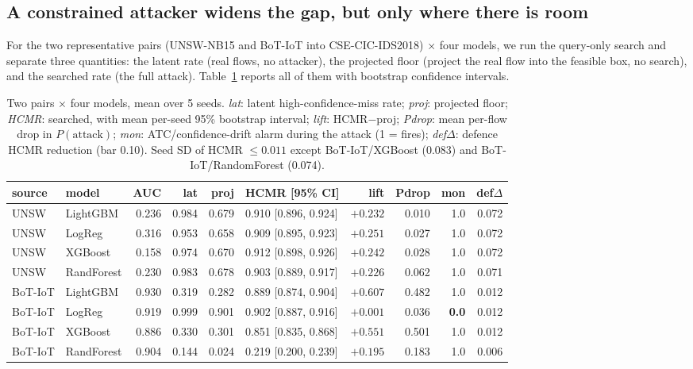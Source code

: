 \documentclass[11pt]{article}
\begin{document}
\subsection{A constrained attacker widens the gap, but only where there is room}
For the two representative pairs (UNSW-NB15 and BoT-IoT into CSE-CIC-IDS2018) $\times$ four models, we run the query-only search and separate three quantities: the latent rate (real flows, no attacker), the projected floor (project the real flow into the feasible box, no search), and the searched rate (the full attack). Table~\ref{tab:1} reports all of them with bootstrap confidence intervals.

\begin{table}[htbp]\centering\footnotesize
\caption{Two pairs $\times$ four models, mean over 5 seeds. \emph{lat}: latent high-confidence-miss rate; \emph{proj}: projected floor; \emph{HCMR}: searched, with mean per-seed 95\% bootstrap interval; \emph{lift}: HCMR$-$proj; \emph{Pdrop}: mean per-flow drop in $P(\text{attack})$; \emph{mon}: ATC/confidence-drift alarm during the attack (1 = fires); \emph{def$\Delta$}: defence HCMR reduction (bar 0.10). Seed SD of HCMR $\le 0.011$ except BoT-IoT/XGBoost (0.083) and BoT-IoT/RandomForest (0.074).}
\label{tab:1}
\begin{tabular}{llrrrlrrrr}
\toprule
source & model & AUC & lat & proj & HCMR [95\% CI] & lift & Pdrop & mon & def$\Delta$ \\
\midrule
UNSW & LightGBM & 0.236 & 0.984 & 0.679 & 0.910 [0.896, 0.924] & $+0.232$ & 0.010 & 1.0 & 0.072 \\
UNSW & LogReg & 0.316 & 0.953 & 0.658 & 0.909 [0.895, 0.923] & $+0.251$ & 0.027 & 1.0 & 0.072 \\
UNSW & XGBoost & 0.158 & 0.974 & 0.670 & 0.912 [0.898, 0.926] & $+0.242$ & 0.028 & 1.0 & 0.072 \\
UNSW & RandForest & 0.230 & 0.983 & 0.678 & 0.903 [0.889, 0.917] & $+0.226$ & 0.062 & 1.0 & 0.071 \\
BoT-IoT & LightGBM & 0.930 & 0.319 & 0.282 & 0.889 [0.874, 0.904] & $+0.607$ & 0.482 & 1.0 & 0.012 \\
BoT-IoT & LogReg & 0.919 & 0.999 & 0.901 & 0.902 [0.887, 0.916] & $+0.001$ & 0.036 & \textbf{0.0} & 0.012 \\
BoT-IoT & XGBoost & 0.886 & 0.330 & 0.301 & 0.851 [0.835, 0.868] & $+0.551$ & 0.501 & 1.0 & 0.012 \\
BoT-IoT & RandForest & 0.904 & 0.144 & 0.024 & 0.219 [0.200, 0.239] & $+0.195$ & 0.183 & 1.0 & 0.006 \\
\bottomrule
\end{tabular}
\end{table}
\end{document}
